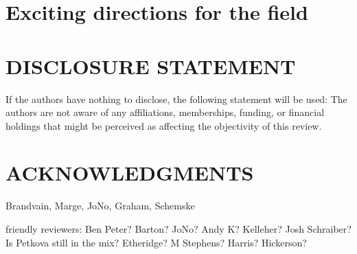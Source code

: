 \documentclass{ar-1col}
\newcommand{\g}[1]{{\color{blue}{#1}}}
\newcommand{\todo}[1]{{\textbf{\color{red}{#1}}}}
\begin{document}
\g{feel like i'm not making the point clearly}

\todo{read through, edit, rewrite?}

\section{Exciting directions for the field}

\todo{
\begin{itemize}
\item what about selection?
\item recap - complicate the world
\item the past
\end{itemize}
}

\section*{DISCLOSURE STATEMENT}
If the authors have nothing to disclose, the following statement will be used: The authors are not aware of any affiliations, memberships, funding, or financial holdings that
might be perceived as affecting the objectivity of this review.

\section*{ACKNOWLEDGMENTS}
Brandvain, Marge, JoNo, Graham, Schemske


friendly reviewers:
Ben Peter? Barton? JoNo? Andy K? Kelleher? Josh Schraiber? Is Petkova still in the mix?
Etheridge? M Stephens? Harris? Hickerson?



\end{document}
